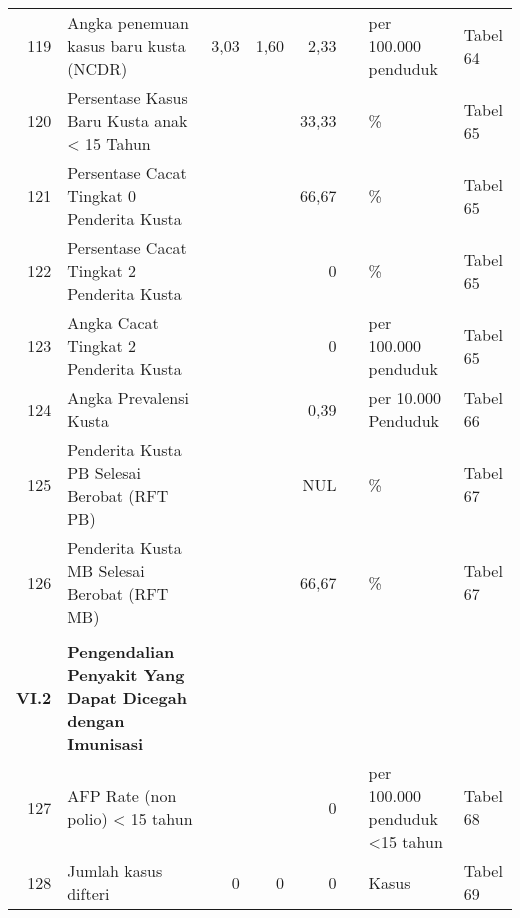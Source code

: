 \begin{small}
\begin{longtable}{rY{12em}rrrrY{5em}Y{5em}}
	119 & Angka penemuan kasus baru kusta (NCDR)                                      &   3,03 &   1,60 &               2,33 &          & per 100.000 penduduk           & Tabel 64 \\
	120 & Persentase Kasus Baru Kusta anak < 15 Tahun                                 &        &        &              33,33 &          & \%                             & Tabel 65 \\
	121 & Persentase Cacat Tingkat 0 Penderita Kusta                                  &        &        &              66,67 &          & \%                             & Tabel 65 \\
	122 & Persentase Cacat Tingkat 2 Penderita Kusta                                  &        &        &                  0 &          & \%                             & Tabel 65 \\
	123 & Angka Cacat Tingkat 2 Penderita Kusta                                       &        &        &                  0 &          & per 100.000 penduduk           & Tabel 65 \\
	124 & Angka Prevalensi Kusta                                                      &        &        &               0,39 &          & per 10.000 Penduduk            & Tabel 66 \\
	125 & Penderita Kusta PB Selesai Berobat (RFT PB)                                 &        &        &                NUL &          & \%                             & Tabel 67 \\
	126 & Penderita Kusta MB Selesai Berobat (RFT MB)                                 &        &        &              66,67 &          & \%                             & Tabel 67 \\
	&                                                                                 &        &        &                    &          &                                &          \\
	\textbf{VI.2} & \textbf{Pengendalian Penyakit Yang Dapat Dicegah dengan Imunisasi}&        &        &                    &          &                                &          \\
	127 & AFP Rate (non polio) < 15 tahun                                             &        &        &                  0 &          & per 100.000 penduduk <15 tahun & Tabel 68 \\
	128 & Jumlah kasus difteri                                                        &      0 &      0 &                  0 &          & Kasus                          & Tabel 69 \\

\end{longtable}
\end{small}
